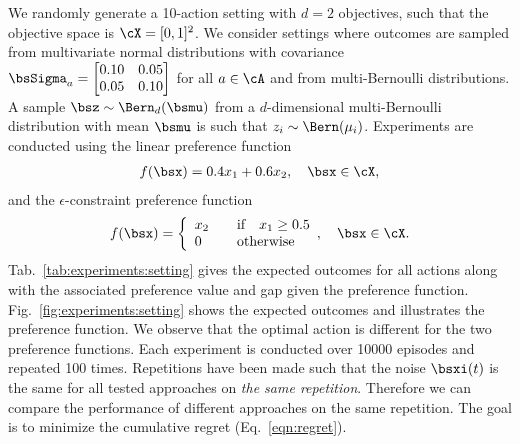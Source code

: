 We randomly generate a 10-action setting with $d = 2$ objectives, such that the objective space is $\cX = [0, 1]^2$. We consider settings where outcomes are sampled from multivariate normal distributions with covariance
$
    \bsSigma_a =
        \begin{bmatrix}
            0.10 & 0.05 \\
            0.05 & 0.10
        \end{bmatrix}
$ for all $a \in \cA$ and from multi-Bernoulli distributions. A sample $\bsz \sim \Bern_d(\bsmu)$ from a $d$-dimensional multi-Bernoulli distribution with mean $\bsmu$ is such that $z_i \sim \Bern(\mu_i)$. Experiments are conducted using the linear preference function
\begin{align*}
    f(\bsx) = 0.4 x_1 + 0.6 x_2, \quad \bsx \in \cX,
\end{align*}
and the $\epsilon$-constraint preference function
\begin{align*}
    f(\bsx) = \bigg\{
        \begin{array}{ll}
            x_2 & \quad \text{if} \quad x_1 \geq 0.5 \\
            0 & \quad \text{otherwise}
        \end{array}, \quad \bsx \in \cX.
\end{align*}
Tab.~\ref{tab:experiments:setting} gives the expected outcomes for all actions along with the associated preference value and gap given the preference function. Fig.~\ref{fig:experiments:setting} shows the expected outcomes and illustrates the preference function. We observe that the optimal action is different for the two preference functions. Each experiment is conducted over \num[group-separator={,}]{10000} episodes and repeated 100 times. Repetitions have been made such that the noise $\bsxi(t)$ is the same for all tested approaches on \emph{the same repetition}. Therefore we can compare the performance of different approaches on the same repetition. The goal is to minimize the cumulative regret (Eq.~\ref{eqn:regret}).

